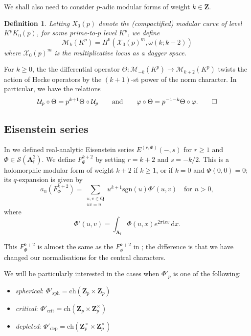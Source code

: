 \documentclass[cjm]{ipart}
\theoremstyle{plain}
\newtheorem{definition}[theorem]{Definition}
\theoremstyle{remark}
\DeclareMathOperator{\crit}{crit}
\newcommand{\Af}{\AA_{\mathrm{f}}}
\newcommand{\QQ}{\mathbf{Q}}
\newcommand{\ZZ}{\mathbf{Z}}
\newcommand{\Zp}{\mathbf{Z}_p}
\newcommand{\cM}{\mathcal{M}}
\newcommand{\cS}{\mathcal{S}}
\newcommand{\cU}{\mathcal{U}}
\newcommand{\cX}{\mathcal{X}}
\newcommand{\ch}{\mathrm{ch}}
\newcommand{\dep}{\mathrm{dep}}
\newcommand{\sgn}{\mathrm{sgn}}
\renewcommand{\AA}{\mathbf{A}}
\numberwithin{equation}{subsection}
\renewcommand{\ge}{\geqslant}
\begin{document}
We shall also need to consider $p$-adic modular forms of weight $k \in \ZZ$.

\begin{definition}
 Letting $X_0(p)$ denote the (compactified) modular curve of level $K^p K_0(p)$, for some prime-to-$p$ level $K^p$, we define
 \[ \cM_{k}(K^p) = H^0\left(\cX_0(p)^{m}, \omega(k; k-2)\right) \]
 where $\cX_0(p)^{m}$ is the multiplicative locus as a dagger space.
\end{definition}

\begin{note}
 For $k \ge 0$, the the differential operator
 \( \Theta: \cM_{-k}(K^p) \to \cM_{k+2}(K^p) \)
 twists the action of Hecke operators by the $(k+1)$-st power of the norm character. In particular, we have the relations
 \[ \cU_p \circ \Theta = p^{k+1} \Theta \circ \cU_p\qquad \text{and}\qquad \varphi \circ \Theta = p^{-1-k} \Theta \circ \varphi. \qedhere\]
\end{note}


\subsection{ Eisenstein series}
\label{sect:eisseries}
In \cite[\S 7.1]{LPSZ1} we defined real-analytic Eisenstein series $E^{(r, \Phi)}(-, s)$ for $r \ge 1$ and $\Phi \in \cS(\Af^2)$. We define $F^{k+2}_{\Phi}$ by setting $r = k+2$ and $s = -k/2$. This is a holomorphic modular form of weight $k+2$ if $k \ge 1$, or if $k = 0$ and $\Phi(0, 0) = 0$; its $q$-expansion is given by
\[ a_n\left(F^{k+2}_{\Phi}\right) = \sum_{\substack{u, v \in \QQ \\ uv = n}} u^{k+1} \sgn(u)\Phi'(u, v) \quad\text{for $n > 0$}, \]
where
\begin{equation}\label{eq:Fourier}
 \Phi'(u, v) = \int_{\Af}\Phi(u, x) e^{2\pi i xv}\, \mathrm{d}x.
\end{equation}

\begin{remark}
 This $F^{k+2}_{\Phi}$ is almost the same as the $F^{k+2}_{\phi}$ in \cite[Theorem 7.2.2]{LSZ17}; the difference is that we have changed our normalisations for the central characters.
\end{remark}

We will be particularly interested in the cases when $\Phi'_p$ is one of the following:
\begin{itemize}
 \item \emph{spherical}: $\Phi'_\mathrm{sph} = \ch(\Zp \times \Zp)$
 \item \emph{critical}: $\Phi'_{\crit} = \ch(\Zp \times \Zp^\times)$
 \item \emph{depleted}: $\Phi'_{\dep} = \ch(\Zp^\times \times \Zp^\times)$
\end{itemize}
\end{document}
